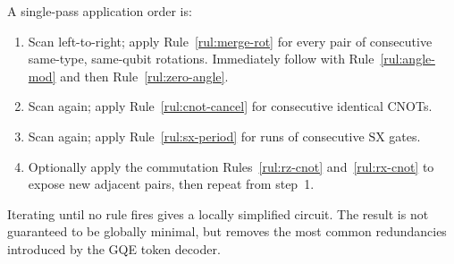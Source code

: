 A single-pass application order is:
\begin{enumerate}
  \item Scan left-to-right; apply Rule~\ref{rul:merge-rot} for every pair of
        consecutive same-type, same-qubit rotations.  Immediately follow with
        Rule~\ref{rul:angle-mod} and then Rule~\ref{rul:zero-angle}.
  \item Scan again; apply Rule~\ref{rul:cnot-cancel} for consecutive identical
        CNOTs.
  \item Scan again; apply Rule~\ref{rul:sx-period} for runs of consecutive
        $\mathrm{SX}$ gates.
  \item Optionally apply the commutation Rules~\ref{rul:rz-cnot}
        and~\ref{rul:rx-cnot} to expose new adjacent pairs, then repeat from
        step~1.
\end{enumerate}

Iterating until no rule fires gives a locally simplified circuit.  The result is
not guaranteed to be globally minimal, but removes the most common redundancies
introduced by the GQE token decoder.

